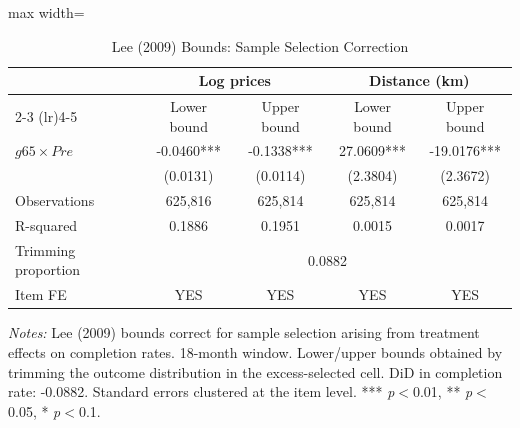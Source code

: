 \begin{table}[htbp]
\centering
\caption{Lee (2009) Bounds: Sample Selection Correction}
\label{tab:lee_bounds}
\begin{adjustbox}{max width=\textwidth}
\begin{threeparttable}
\small
\begin{tabular}{lcccc}
\toprule
 & \multicolumn{2}{c}{Log prices} & \multicolumn{2}{c}{Distance (km)} \\
\cmidrule(lr){2-3} \cmidrule(lr){4-5}
 & Lower bound & Upper bound & Lower bound & Upper bound \\
\midrule
$g65 \times Pre$ & -0.0460*** & -0.1338*** & 27.0609*** & -19.0176*** \\
 & (0.0131) & (0.0114) & (2.3804) & (2.3672) \\
\midrule
Observations & 625,816 & 625,814 & 625,814 & 625,814 \\
R-squared & 0.1886 & 0.1951 & 0.0015 & 0.0017 \\
Trimming proportion & \multicolumn{4}{c}{0.0882} \\
Item FE & YES & YES & YES & YES \\
\bottomrule
\end{tabular}
\begin{tablenotes}
\small
\item \textit{Notes:} Lee (2009) bounds correct for sample selection arising from
treatment effects on completion rates. 18-month window.
Lower/upper bounds obtained by trimming the outcome distribution in the excess-selected cell.
DiD in completion rate: -0.0882.
Standard errors clustered at the item level.
*** \textit{p}$<$0.01, ** \textit{p}$<$0.05, * \textit{p}$<$0.1.
\end{tablenotes}
\end{threeparttable}
\end{adjustbox}
\end{table}
